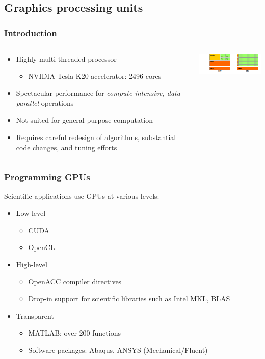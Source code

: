 
\subsection{Graphics processing units}

\begin{frame}[t]
\frametitle{Introduction}
\pause
\begin{columns}[T]
\begin{column}{0.4\textwidth}
\begin{itemize}
    \item <2-> Highly multi-threaded processor
        \begin{itemize}
            \item NVIDIA Tesla K20 accelerator: 2496 cores
        \end{itemize}
    \item <3-> Spectacular performance for
        \emph{compute-intensive, data-parallel} operations
    \item <4-> Not suited for general-purpose computation
    \item <5-> Requires careful redesign of algorithms,
        substantial code changes, and tuning efforts
\end{itemize}
\end{column}
\begin{column}{0.6\textwidth}
 {
    \vspace{2cm}
    \includegraphics[width=180px]
    {img/device-comparison.png}
}
\end{column}
\end{columns}
\end{frame}

\begin{frame}
\frametitle{Programming GPUs}
\pause
Scientific applications use GPUs at various levels:
\begin{itemize}
    \item Low-level
        \begin{itemize}
            \item CUDA
            \item OpenCL
        \end{itemize}
    \item High-level
        \begin{itemize}[<+->]
            \item OpenACC compiler directives
            \item Drop-in support for scientific libraries such as Intel MKL, BLAS
        \end{itemize}
    \item Transparent
        \begin{itemize}[<+->]
            \item MATLAB: over 200 functions
            \item Software packages: Abaqus, ANSYS (Mechanical/Fluent)
        \end{itemize}
\end{itemize}
\end{frame}

